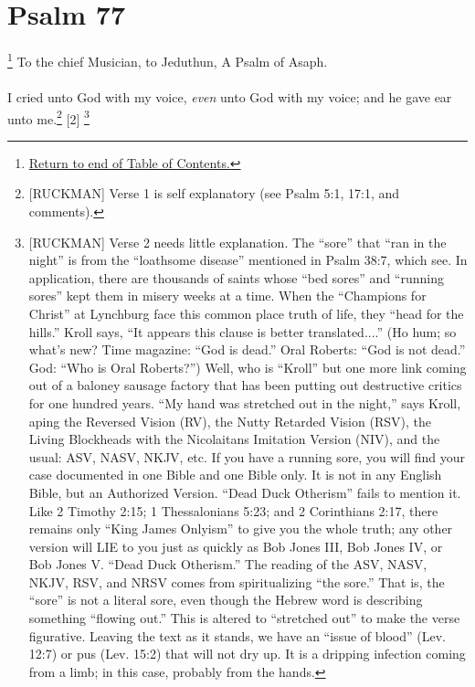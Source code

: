 \chapter{Psalm 77}

\footnote{\textcolor[rgb]{0.00,0.25,0.00}{\hyperlink{TOC}{Return to end of Table of Contents.}}}
\textcolor[rgb]{0.00,0.00,1.00}{To the chief Musician, to Jeduthun, A Psalm of Asaph.}\\
\\
\textcolor[rgb]{0.00,0.00,1.00}{I cried unto God with my voice, \emph{even} unto God with my voice; and he gave ear unto me.}\footnote{[RUCKMAN] Verse 1 is self explanatory (see Psalm 5:1, 17:1, and comments).\cite{Ruckman1992Psalms}}
[2] \footnote{[RUCKMAN] Verse 2 needs little explanation. The “sore” that “ran in the night” is from the “loathsome disease” mentioned in Psalm 38:7, which see. In application, there are thousands of saints whose “bed sores” and “running sores” kept them in misery weeks at a time. When the “Champions for Christ” at Lynchburg face this common place truth of life, they “head for the hills.” Kroll says, “It appears this clause is better translated....” (Ho hum; so what’s new? Time magazine: “God is dead.” Oral Roberts: “God is not dead.” God: “Who is Oral Roberts?”) Well, who is “Kroll” but one more link coming out of a baloney sausage factory that has been putting out destructive critics for one hundred years. “My hand was stretched out in the night,” says Kroll, aping the Reversed Vision (RV), the Nutty Retarded Vision (RSV), the Living Blockheads with the Nicolaitans Imitation Version (NIV), and the usual: ASV, NASV, NKJV, etc. If you have a running sore, you will find your case documented in one Bible and one Bible only. It is not in any English Bible, but an Authorized Version. “Dead Duck Otherism” fails to mention it. Like 2 Timothy 2:15; 1 Thessalonians 5:23; and 2 Corinthians 2:17, there remains only “King James Onlyism” to give you the whole truth; any other version will LIE to you just as quickly as Bob Jones III, Bob Jones IV, or Bob Jones V. “Dead Duck Otherism.” The reading of the ASV, NASV, NKJV, RSV, and NRSV comes from spiritualizing “the sore.” That is, the “sore” is not a literal sore, even though the Hebrew word is describing something “flowing out.” This is altered to “stretched out” to make the verse figurative. Leaving the text as it stands, we have an “issue of blood” (Lev. 12:7) or pus (Lev. 15:2) that will not dry up. It is a dripping infection coming from a limb; in this case, probably from the hands.\cite{Ruckman1992Psalms} 
}
